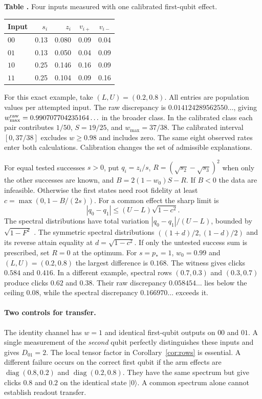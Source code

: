 \documentclass[11pt,letterpaper]{article}
\begin{document}
\begin{center}\small\begin{minipage}{\linewidth}\centering
{}\label{tab:calrates}\textbf{Table \thetable.} Four inputs measured with one calibrated first-qubit effect.\\[4pt]
\begin{tabular}{@{}lrrrr@{}}
\toprule
Input & $s_i$ & $z_i$ & $v_{i+}$ & $v_{i-}$\\\midrule
$00$ & 0.13 & 0.080 & 0.09 & 0.04\\
$01$ & 0.13 & 0.050 & 0.04 & 0.09\\
$10$ & 0.25 & 0.146 & 0.16 & 0.09\\
$11$ & 0.25 & 0.104 & 0.09 & 0.16\\\bottomrule
\end{tabular}\end{minipage}
\end{center}
For this exact example, take $(L,U)=(0.2,0.8)$. All entries are population values per attempted input. The raw discrepancy is $0.014124289562550\ldots$, giving $w_{\max}^{\rm raw}=0.990707704235164\ldots$ in the broader class. In the calibrated class each pair contributes $1/50$, $S=19/25$, and $w_{\max}=37/38$. The calibrated interval $[0,37/38]$ excludes $w\ge0.98$ and includes zero. The same eight observed rates enter both calculations. Calibration changes the set of admissible explanations.

For equal tested successes $s>0$, put $q_i=z_i/s$, $R=(\sqrt{s_2}-\sqrt{s_3})^2$ when only the other successes are known, and $B=2(1-w_0)S-R$. If $B<0$ the data are infeasible. Otherwise the first states need root fidelity at least $c=\max(0,1-B/(2s))$. For a common effect the sharp limit is
\[
 |q_0-q_1|\le (U-L)\sqrt{1-c^2}.
\]
The spectral distributions have total variation $|q_0-q_1|/(U-L)$, bounded by $\sqrt{1-F^2}$ \cite{watrous}. The symmetric spectral distributions $((1+d)/2,(1-d)/2)$ and its reverse attain equality at $d=\sqrt{1-c^2}$. If only the untested success sum is prescribed, set $R=0$ at the optimum. For $s=p_*=1$, $w_0=0.99$ and $(L,U)=(0.2,0.8)$ the largest difference is $0.168$. The witness gives clicks $0.584$ and $0.416$. In a different example, spectral rows $(0.7,0.3)$ and $(0.3,0.7)$ produce clicks $0.62$ and $0.38$. Their raw discrepancy $0.058454\ldots$ lies below the ceiling $0.08$, while the spectral discrepancy $0.166970\ldots$ exceeds it.

\paragraph{Two controls for transfer.}
The identity channel has $w=1$ and identical first-qubit outputs on $00$ and $01$. A single measurement of the \emph{second} qubit perfectly distinguishes these inputs and gives $D_{01}=2$. The local tensor factor in Corollary~\ref{cor:rows} is essential. A different failure occurs on the correct first qubit if the arm effects are $\operatorname{diag}(0.8,0.2)$ and $\operatorname{diag}(0.2,0.8)$. They have the same spectrum but give clicks $0.8$ and $0.2$ on the identical state $|0\rangle$. A common spectrum alone cannot establish readout transfer.
\end{document}
